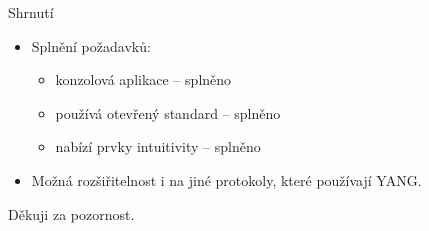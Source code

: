 \documentclass[czech,aspectratio=169]{beamer}
\begin{document}

\begin{frame}{Shrnutí}
\begin{itemize}
\item[] Splnění požadavků:
    \begin{itemize}
        \pause{}
        \item konzolová aplikace\pause{} -- splněno
        \pause{}
        \item používá otevřený standard\pause{} -- splněno
        \pause{}
        \item nabízí prvky intuitivity\pause{} -- splněno
    \end{itemize}
    \pause{}
\item[] Možná rozšiřitelnost i na jiné protokoly, které používají YANG\@.
\end{itemize}
\pause{}
\vfill
Děkuji za pozornost.

\end{frame}
\end{document}
